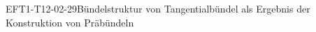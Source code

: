 
\begin{EXA}{EFT1-T12-02-29}{Bündelstruktur von Tangentialbündel als Ergebnis der Konstruktion von Präbündeln}
\end{EXA}
